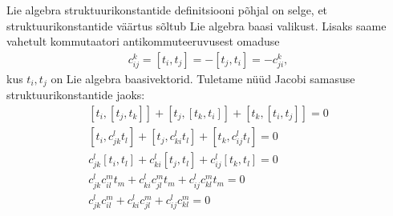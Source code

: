 \documentclass[a4paper,12pt]{article}
\theoremstyle{plain}
\theoremstyle{definition}
\numberwithin{equation}{section}
\begin{document}
Lie algebra struktuurikonstantide definitsiooni põhjal on selge, et struktuurikonstantide väärtus sõltub Lie algebra baasi valikust. Lisaks saame vahetult kommutaatori antikommuteeruvusest omaduse
\begin{align} \label{eq:struktuurikonst-antikomm}
c_{ij}^{k} = \left[t_i, t_j\right] = - \left[t_j, t_i\right] = - c_{ji}^{k},
\end{align}
kus $t_i, t_j$ on Lie algebra baasivektorid. Tuletame nüüd Jacobi samasuse struktuurikonstantide jaoks:
\begin{align*}
\left[t_i, \left[t_j, t_k\right]\right] + \left[t_j, \left[t_k, t_i\right]\right] + \left[t_k, \left[t_i, t_j\right]\right] = 0 \\
\left[t_i, c_{jk}^{l}t_l\right] + \left[t_j, c_{ki}^{l}t_l\right] + \left[t_k, c_{ij}^{l}t_l\right] = 0 \\
c_{jk}^{l} \left[t_i, t_l\right] + c_{ki}^{l} \left[t_j, t_l\right] + c_{ij}^{l} \left[t_k, t_l\right] = 0 \\
c_{jk}^{l} c_{il}^{m} t_m + c_{ki}^{l} c_{jl}^{m} t_m + c_{ij}^{l} c_{kl}^{m} t_m = 0 \\
c_{jk}^{l} c_{il}^{m} + c_{ki}^{l} c_{jl}^{m} + c_{ij}^{l} c_{kl}^{m} = 0
\end{align*}
\end{document}
